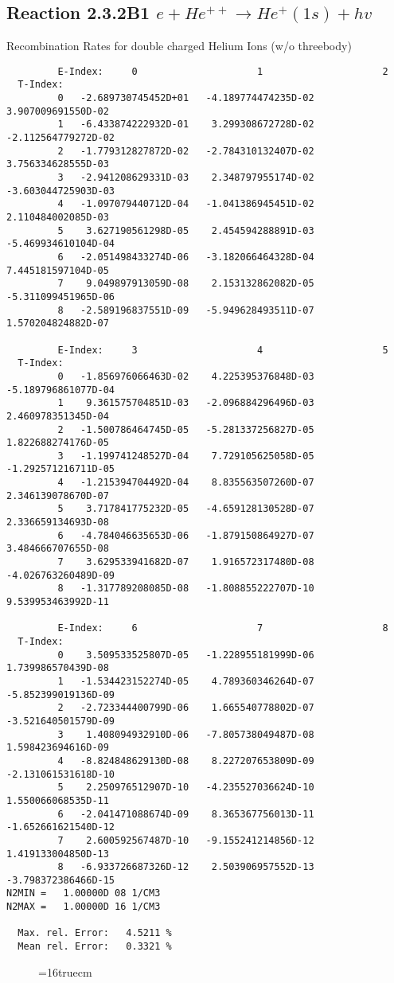 \documentclass[12pt,dvipdfmx]{article}
\begin{document}
\subsection{
Reaction 2.3.2B1  $e + He^{++} \rightarrow He^+(1s) + hv$
}
  Recombination Rates for double charged Helium Ions (w/o threebody)

\begin{small}\begin{verbatim}
         E-Index:     0                     1                     2
  T-Index:
         0   -2.689730745452D+01   -4.189774474235D-02    3.907009691550D-02
         1   -6.433874222932D-01    3.299308672728D-02   -2.112564779272D-02
         2   -1.779312827872D-02   -2.784310132407D-02    3.756334628555D-03
         3   -2.941208629331D-03    2.348797955174D-02   -3.603044725903D-03
         4   -1.097079440712D-04   -1.041386945451D-02    2.110484002085D-03
         5    3.627190561298D-05    2.454594288891D-03   -5.469934610104D-04
         6   -2.051498433274D-06   -3.182066464328D-04    7.445181597104D-05
         7    9.049897913059D-08    2.153132862082D-05   -5.311099451965D-06
         8   -2.589196837551D-09   -5.949628493511D-07    1.570204824882D-07

         E-Index:     3                     4                     5
  T-Index:
         0   -1.856976066463D-02    4.225395376848D-03   -5.189796861077D-04
         1    9.361575704851D-03   -2.096884296496D-03    2.460978351345D-04
         2   -1.500786464745D-05   -5.281337256827D-05    1.822688274176D-05
         3   -1.199741248527D-04    7.729105625058D-05   -1.292571216711D-05
         4   -1.215394704492D-04    8.835563507260D-07    2.346139078670D-07
         5    3.717841775232D-05   -4.659128130528D-07    2.336659134693D-08
         6   -4.784046635653D-06   -1.879150864927D-07    3.484666707655D-08
         7    3.629533941682D-07    1.916572317480D-08   -4.026763260489D-09
         8   -1.317789208085D-08   -1.808855222707D-10    9.539953463992D-11

         E-Index:     6                     7                     8
  T-Index:
         0    3.509533525807D-05   -1.228955181999D-06    1.739986570439D-08
         1   -1.534423152274D-05    4.789360346264D-07   -5.852399019136D-09
         2   -2.723344400799D-06    1.665540778802D-07   -3.521640501579D-09
         3    1.408094932910D-06   -7.805738049487D-08    1.598423694616D-09
         4   -8.824848629130D-08    8.227207653809D-09   -2.131061531618D-10
         5    2.250976512907D-10   -4.235527036624D-10    1.550066068535D-11
         6   -2.041471088674D-09    8.365367756013D-11   -1.652661621540D-12
         7    2.600592567487D-10   -9.155241214856D-12    1.419133004850D-13
         8   -6.933726687326D-12    2.503906957552D-13   -3.798372386466D-15
N2MIN =   1.00000D 08 1/CM3
N2MAX =   1.00000D 16 1/CM3

  Max. rel. Error:   4.5211 %
  Mean rel. Error:   0.3321 %

\end{verbatim}\end{small}
\begin{figure} \label{2.3.2B1}
\epsfxsize=16truecm
\end{figure}
\newpage
\end{document}
